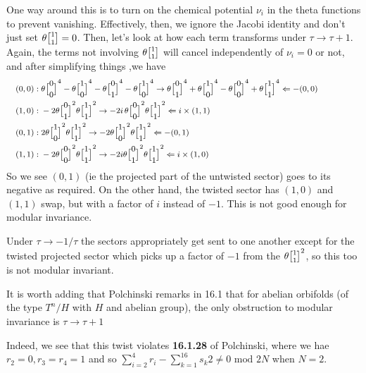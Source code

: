 \documentclass[11pt, class=article, crop=false]{standalone}
\begin{document}
\begin{enumerate}
	One way around this is to turn on the chemical potential $\nu_i$ in the theta functions to prevent vanishing. Effectively, then, we ignore the Jacobi identity and don't just set $\theta\twist11 = 0$. Then, let's look at how each term transforms under $\tau \to \tau+1$. Again, the terms not involving $\theta\twist11$ will cancel independently of $\nu_i = 0$ or not, and after simplifying things ,we have
	\[
	\footnotesize
	\hspace{-.5in}
	\begin{aligned}
		(0,0):\;&  \theta\twist00^4 - \theta\twist10^4 - \theta\twist01^4 - \theta\twist10^4 \to \theta\twist01^4 + \theta\twist10^4 - \theta\twist00^4 + \theta\twist11^4 \Leftarrow - (0,0)\\
		(1,0):\;&   - 2 \theta \twist01^2  \theta \twist11^2 \to -2 i\, \theta \twist00^2  \theta \twist11^2  \Leftarrow i \times (1,1) \\
		(0,1):\;&  2 \theta \twist10^2 \theta \twist11^2
		\to -2 \theta \twist10^2 \theta \twist11^2 \Leftarrow -(0,1) \\
		(1,1):\;&  -2\theta \twist00^2 \theta\twist11^2  \to -2 i \theta \twist01^2 \theta\twist11^2 \Leftarrow i \times (1,0)
	\end{aligned}
	\]
	So we see $(0,1)$ (ie the projected part of the untwisted sector) goes to its negative as required. On the other hand, the twisted sector has $(1,0)$ and $(1,1)$ swap, but with a factor of $i$ instead of $-1$. This is not good enough for modular invariance. 
	
	Under $\tau \to -1/\tau$ the sectors appropriately get sent to one another except for the twisted projected sector which picks up a factor of $-1$ from the $\theta \twist11^2$, so this too is not modular invariant.
	
	It is worth adding that Polchinski remarks in 16.1 that for abelian orbifolds (of the type $T^n/H$ with $H$ and abelian group), the only obstruction to modular invariance is $\tau \to \tau+1$ 
	
	Indeed, we see that this twist violates \textbf{16.1.28} of Polchinski, where we hae $r_2=0, r_3=r_4=1$ and so $\sum_{i=2}^4 r_i - \sum_{k=1}^{16} s_k 2 \neq 0 \text{ mod } 2N$ when $N = 2$.
	

\end{enumerate}
\end{document}
